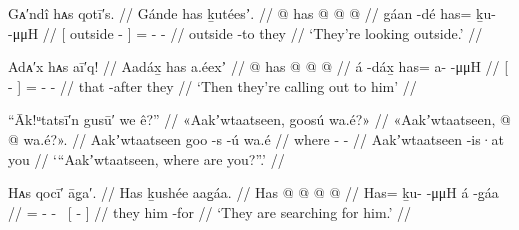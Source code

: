 \ex\label{ex:100-22-looking-outside}%
%
\begingl
	\glpreamble	Gᴀ′ndî hᴀs qotī′s. //
	\glpreamble	Gánde has ḵutéesʼ. //
	\gla	{}  @ {} {}
		has @  @ {} @ {} //
	\glb	{} gáan -dé {}
		has= ḵu-  -μμH //
	\glc	{}[ outside - {}]
		= -  - //
	\gld	{} outside -to {}
		they  {} {} //
	\glft	‘They’re looking outside.’
		//
\endgl
\xe

\ex\label{ex:100-23-calling-out}%
%
\begingl
	\glpreamble	Adᴀ′x hᴀs aī′q! //
	\glpreamble	Aadáx̱ has a.éexʼ //
	\gla	{}  @ {} {}
		has @  @ {} @ {} //
	\glb	{} á -dáx̱ {}
		has= a-  -μμH //
	\glc	{}[  - {}]
		= -  - //
	\gld	{} that -after {}
		they  {} {} //
	\glft	‘Then they’re calling out to him’
		//
\endgl
\xe

\ex\label{ex:100-24-where-are-you}%
%
\begingl
	\glpreamble	“Āk!ᵘtatsī′n gusū′ we ê?” //
	\glpreamble	«\!Aakʼwtaatseen, goosú wa.é?\!» //
	\gla	«\!Aakʼwtaatseen,  @ {} @ {} wa.é?\!». //
	\glb	\phantom{«\!}Aakʼwtaatseen goo -s -ú wa.é //
	\glc	\phantom{«\!} where - -  //
	\gld	\phantom{«\!}Aakʼwtaatseen  {} -is·at you //
	\glft	‘“Aakʼwtaatseen, where are you?”.’
		//
\endgl
\xe

\ex\label{ex:100-25-searching-for-him}%
%
\begingl
	\glpreamble	Hᴀs qocī′ āg̣a′. //
	\glpreamble	Has ḵushée aag̱áa. //
	\gla	Has @  @ {} @ {}
		{}  @ {} {} //
	\glb	Has= ḵu-  -μμH
		{} á -g̱áa {} //
	\glc	{}= -  -
		~{}[  - {}] //
	\gld	they  {} {}
		{} him -for {} //
	\glft	‘They are searching for him.’
		//
\endgl
\xe

